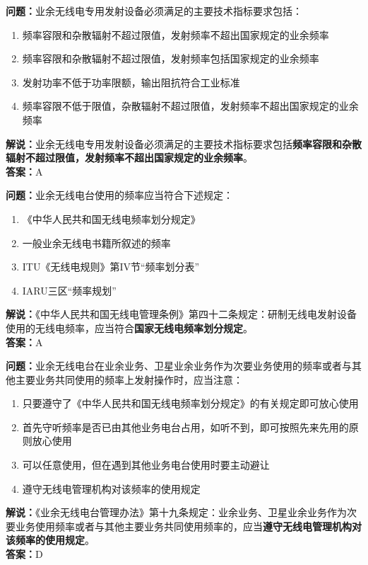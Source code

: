 \documentclass{ctexbook}
\begin{document}
\bigskip


\noindent\textbf{问题：}业余无线电专用发射设备必须满足的主要技术指标要求包括：
\begin{enumerate}[label=\Alph*), leftmargin=3em]
	\item 频率容限和杂散辐射不超过限值，发射频率不超出国家规定的业余频率
	\item 频率容限和杂散辐射不超过限值，发射频率包括国家规定的业余频率
	\item 发射功率不低于功率限额，输出阻抗符合工业标准
	\item 频率容限不低于限值，杂散辐射不超过限值，发射频率不超出国家规定的业余频率
\end{enumerate}
\noindent\textbf{解说：}业余无线电专用发射设备必须满足的主要技术指标要求包括\textbf{频率容限和杂散辐射不超过限值，发射频率不超出国家规定的业余频率}。\\\noindent\textbf{答案：}A




\bigskip


\noindent\textbf{问题：}业余无线电台使用的频率应当符合下述规定：
\begin{enumerate}[label=\Alph*), leftmargin=3em]
	\item 《中华人民共和国无线电频率划分规定》
	\item 一般业余无线电书籍所叙述的频率
	\item ITU《无线电规则》第IV节“频率划分表”
	\item IARU三区“频率规划”
\end{enumerate}
\noindent\textbf{解说：}《中华人民共和国无线电管理条例》第四十二条规定：研制无线电发射设备使用的无线电频率，应当符合\textbf{国家无线电频率划分规定}。\\\noindent\textbf{答案：}A




\bigskip


\noindent\textbf{问题：}业余无线电台在业余业务、卫星业余业务作为次要业务使用的频率或者与其他主要业务共同使用的频率上发射操作时，应当注意：
\begin{enumerate}[label=\Alph*), leftmargin=3em]
	\item 只要遵守了《中华人民共和国无线电频率划分规定》的有关规定即可放心使用
	\item 首先守听频率是否已由其他业务电台占用，如听不到，即可按照先来先用的原则放心使用
	\item 可以任意使用，但在遇到其他业务电台使用时要主动避让
	\item 遵守无线电管理机构对该频率的使用规定
\end{enumerate}
\noindent\textbf{解说：}《业余无线电台管理办法》第十九条规定：业余业务、卫星业余业务作为次要业务使用频率或者与其他主要业务共同使用频率的，应当\textbf{遵守无线电管理机构对该频率的使用规定}。\\\noindent\textbf{答案：}D
\end{document}
